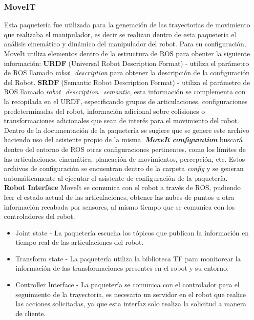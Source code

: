             \subsubsection{MoveIT}
            Esta paquetería fue utilizada para la generación de las trayectorias de movimiento que realizaba el manipulador, es decir se realizan dentro de esta paquetería el análisis cinemático y dinámico del manipulador del robot. Para su configuración, MoveIt utiliza elementos dentro de la estructura de ROS para obenter la siguiente información: \textbf{URDF} (Universal Robot Description Format) - utiliza el parámetro de ROS llamado \textit{robot\_description} para obtener la descripción de la configuración del Robot. \textbf{SRDF} (Semantic Robot Description Format) - utiliza el parámetro de ROS llamado \textit{robot\_description\_semantic}, esta información se complementa con la recopilada en el URDF, especificando grupos de articulaciones, configuraciones predeterminadas del robot, información adicional sobre colisiones o transformaciones adicionales que sean de interés para el movimiento del robot. Dentro de la documentación de la paquetería se sugiere que se genere este archivo haciendo uso del asistente propio de la misma. \textbf{\textit{MoveIt configuration}} buscará dentro del entorno de ROS otras configuraciones pertinentes, como los límites de las articulaciones, cinemática, planeación de movimientos, percepción, etc. Estos archivos de configuración se encuentran dentro de la carpeta \textit{config} y se generan automáticamente al ejecutar el asistente de configuración de la paquetería.
            \textbf{Robot Interface}
             MoveIt se comunica con el robot a través de ROS, pudiendo leer el estado actual de las articulaciones, obtener las nubes de puntos u otra información recabada por sensores, al mismo tiempo que se comunica con los controladores del robot.
             \begin{itemize}
                 \item Joint state - La paquetería escucha los tópicos que publican la información en tiempo real de las articulaciones del robot.
                 \item Transform state - La paquetería utiliza la biblioteca TF para monitorear la información de las transformaciones presentes en el robot y su entorno.
                 \item Controller Interface - La paquetería se comunica con el controlador para el seguimiento de la trayectoria, es necesario un servidor en el robot que realice las acciones solicitadas, ya que esta interfaz solo realiza la solicitud a manera de cliente.
             \end{itemize}

